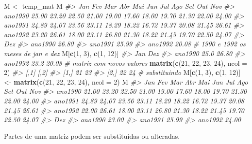 \documentclass[]{book}
\newenvironment{Shaded}{\begin{snugshade}}{\end{snugshade}}
\newcommand{\KeywordTok}[1]{\textcolor[rgb]{0.13,0.29,0.53}{\textbf{#1}}}
\newcommand{\DataTypeTok}[1]{\textcolor[rgb]{0.13,0.29,0.53}{#1}}
\newcommand{\DecValTok}[1]{\textcolor[rgb]{0.00,0.00,0.81}{#1}}
\newcommand{\StringTok}[1]{\textcolor[rgb]{0.31,0.60,0.02}{#1}}
\newcommand{\CommentTok}[1]{\textcolor[rgb]{0.56,0.35,0.01}{\textit{#1}}}
\newcommand{\NormalTok}[1]{#1}
\begin{document}
\begin{Shaded}
\begin{Highlighting}[]
\NormalTok{M <-}\StringTok{ }\NormalTok{temp_mat}
\NormalTok{M}
\CommentTok{#>           Jan   Fev   Mar   Abr   Mai   Jun   Jul   Ago   Set   Out   Nov}
\CommentTok{#> ano1990 25.00 23.20 22.50 21.00 19.00 17.60 18.00 19.70 21.30 22.00 24.00}
\CommentTok{#> ano1991 24.89 24.07 23.56 23.11 18.29 18.22 16.72 19.37 20.08 21.45 26.61}
\CommentTok{#> ano1992 23.20 26.61 18.00 23.11 26.80 21.30 18.22 21.45 19.70 22.50 24.07}
\CommentTok{#>           Dez}
\CommentTok{#> ano1990 26.80}
\CommentTok{#> ano1991 25.99}
\CommentTok{#> ano1992 20.08}
\CommentTok{# 1990 e 1992 os meses de jan e dez}
\NormalTok{M[}\KeywordTok{c}\NormalTok{(}\DecValTok{1}\NormalTok{, }\DecValTok{3}\NormalTok{), }\KeywordTok{c}\NormalTok{(}\DecValTok{1}\NormalTok{, }\DecValTok{12}\NormalTok{)]}
\CommentTok{#>          Jan   Dez}
\CommentTok{#> ano1990 25.0 26.80}
\CommentTok{#> ano1992 23.2 20.08}
\CommentTok{# matriz com novos valores}
\KeywordTok{matrix}\NormalTok{(}\KeywordTok{c}\NormalTok{(}\DecValTok{21}\NormalTok{, }\DecValTok{22}\NormalTok{, }\DecValTok{23}\NormalTok{, }\DecValTok{24}\NormalTok{), }\DataTypeTok{ncol =} \DecValTok{2}\NormalTok{)}
\CommentTok{#>      [,1] [,2]}
\CommentTok{#> [1,]   21   23}
\CommentTok{#> [2,]   22   24}
\CommentTok{# substituindo}
\NormalTok{M[}\KeywordTok{c}\NormalTok{(}\DecValTok{1}\NormalTok{, }\DecValTok{3}\NormalTok{), }\KeywordTok{c}\NormalTok{(}\DecValTok{1}\NormalTok{, }\DecValTok{12}\NormalTok{)] <-}\StringTok{ }\KeywordTok{matrix}\NormalTok{(}\KeywordTok{c}\NormalTok{(}\DecValTok{21}\NormalTok{, }\DecValTok{22}\NormalTok{, }\DecValTok{23}\NormalTok{, }\DecValTok{24}\NormalTok{), }\DataTypeTok{ncol =} \DecValTok{2}\NormalTok{)}
\NormalTok{M}
\CommentTok{#>           Jan   Fev   Mar   Abr   Mai   Jun   Jul   Ago   Set   Out   Nov}
\CommentTok{#> ano1990 21.00 23.20 22.50 21.00 19.00 17.60 18.00 19.70 21.30 22.00 24.00}
\CommentTok{#> ano1991 24.89 24.07 23.56 23.11 18.29 18.22 16.72 19.37 20.08 21.45 26.61}
\CommentTok{#> ano1992 22.00 26.61 18.00 23.11 26.80 21.30 18.22 21.45 19.70 22.50 24.07}
\CommentTok{#>           Dez}
\CommentTok{#> ano1990 23.00}
\CommentTok{#> ano1991 25.99}
\CommentTok{#> ano1992 24.00}
\end{Highlighting}
\end{Shaded}

Partes de uma matriz podem ser substituídas ou alteradas.
\end{document}
